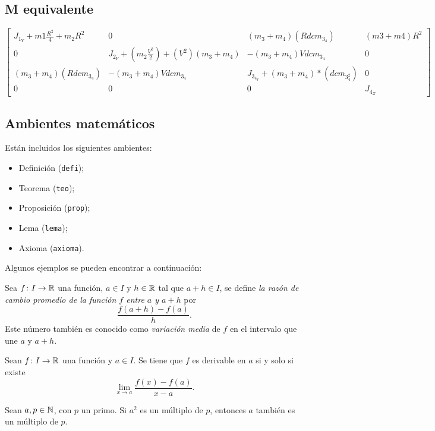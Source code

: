\documentclass{aleph-revista}
\begin{document}
\subsection{M equivalente}   
\begin{equation}
\begin{bmatrix}
J_1_Y + m1\frac{R^2}{4}+m_2R^2 & 0 & (m_3+m_4)(Rdcm_3_4) & (m3+m4)R^2\\
0 &J_2_Y+(m_2\frac{V^2}{2})+(V^2)(m_3+m_4) &-(m_3+m_4)Vdcm_3_4 & 0 \\
(m_3+m_4)(Rdcm_3_4) & -(m_3+m_4)Vdcm_3_4 & J_3_4_Y+(m_3+m_4)*(dcm_3_4^2) & 0\\
0 & 0 & 0 & J_4_Z
\end{bmatrix}
\end{equation}




\subsection{Ambientes matemáticos}
Están incluidos los siguientes ambientes:
\begin{itemize}
    \item Definición (\texttt{defi});
    \item Teorema (\texttt{teo});
    \item Proposición (\texttt{prop});
    \item Lema (\texttt{lema});
    \item Axioma (\texttt{axioma}).
\end{itemize}
Algunos ejemplos se pueden encontrar a continuación:

\begin{defi}
    Sea $f\colon I \rightarrow \mathbb{R}$ una función, $a\in I$ y $h\in\mathbb{R}$ tal que $a+h\in I$, se define \emph{la razón de cambio promedio de la función $f$ entre $a$ y $a+h$} por
    \[
        \frac{f(a+h)-f(a)}{h}.
    \]
    Este número también es conocido como \emph{variación media} de $f$ en el intervalo que une $a$ y $a + h$.
\end{defi}

\begin{prop}
    Sean $f\colon I \rightarrow \mathbb{R}$ una función y $a\in I$. Se tiene que $f$ es derivable en $a$ si y solo si existe
    \[
        \lim_{x\to a}\frac{f(x)-f(a)}{x-a}.
    \]
\end{prop}

\begin{lem}
    Sean $a,p\in\mathbb{N}$, con $p$ un primo. Si $a^2$ es un múltiplo de $p$, entonces $a$ también es un múltiplo de $p$.
\end{lem}
\end{document}
